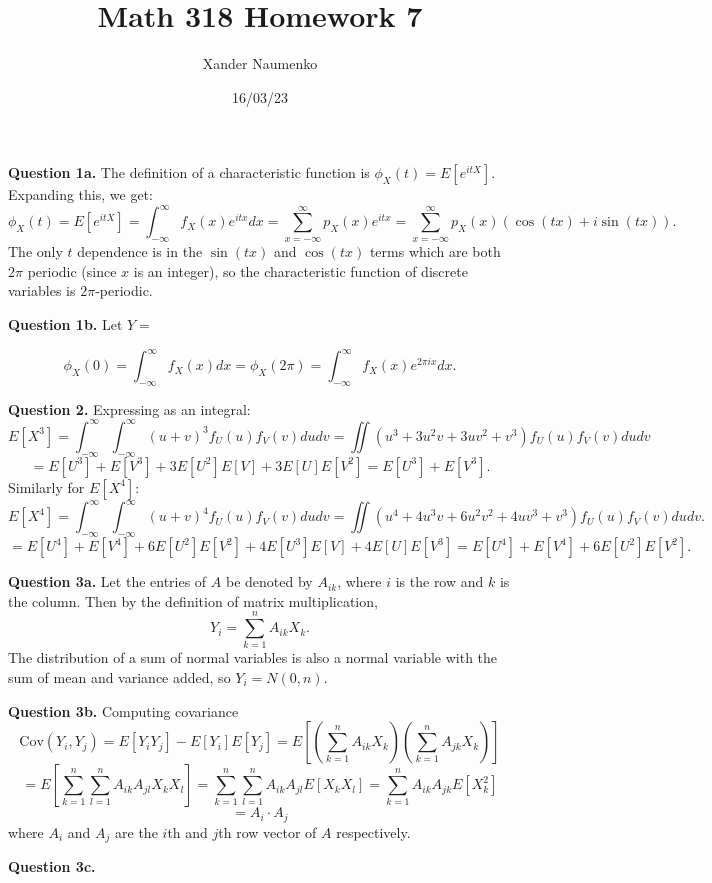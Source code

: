 \documentclass[letterpaper, reqno,11pt]{article}
\begin{document}
\title{Math 318 Homework 7}
\date{16/03/23}
\author{Xander Naumenko}
\maketitle

{\medskip\noindent\bf Question 1a.} The definition of a characteristic function is $\phi_{X}(t)=E[e^{itX}]$. Expanding this, we get: 
\[
\phi_{X}(t)=E[e^{itX}]=\int_{-\infty}^{\infty}f_X(x) e^{itx}dx=\sum_{x=-\infty}^{\infty}p_X(x) e^{itx}=\sum_{x=-\infty}^{\infty}p_X(x) \left( \cos(tx)+i\sin(tx) \right) 
.\]
The only $t$ dependence is in the $\sin(tx)$ and $\cos(tx)$ terms which are both $2\pi$ periodic (since $x$ is an integer), so the characteristic function of discrete variables is $2\pi$-periodic. 

{\medskip\noindent\bf Question 1b.} Let $Y=$

\[
\phi_X(0)=\int_{-\infty}^{\infty}f_X(x)dx=\phi_X(2\pi)=\int_{-\infty}^{\infty}f_X(x)e^{2\pi ix}dx
.\]

{\medskip\noindent\bf Question 2.} Expressing as an integral: 
\[
    E[X^3]=\int_{-\infty}^{\infty}\int_{-\infty}^{\infty}(u+v)^3f_U(u)f_V(v)dudv=\iint (u^3+3u^2v+3uv^2+v^3)f_U(u)f_V(v)dudv
\]
\[
    =E[U^3]+E[V^3]+3E[U^2]E[V]+3E[U]E[V^2]=E[U^3]+E[V^3]
.\]
Similarly for $E[X^{4}]$: 
\[
    E[X^4]=\int_{-\infty}^{\infty}\int_{-\infty}^{\infty}(u+v)^4f_U(u)f_V(v)dudv=\iint (u^4+4u^3v+6u^2v^2+4uv^3+v^3)f_U(u)f_V(v)dudv
.\]
\[
    =E[U^4]+E[V^4]+6E[U^2]E[V^2]+4E[U^3]E[V]+4E[U]E[V^3]=E[U^4]+E[V^4]+6E[U^2]E[V^2]
.\]

{\medskip\noindent\bf Question 3a.} Let the entries of $A$ be denoted by $A_{ik}$, where $i$ is the row and $k$ is the column. Then by the definition of matrix multiplication,
\[
    Y_i=\sum_{k=1}^{n}A_{ik}X_k
.\]
The distribution of a sum of normal variables is also a normal variable with the sum of mean and variance added, so $Y_i=N(0,n)$. 

{\medskip\noindent\bf Question 3b.} Computing covariance
\[
    \text{Cov}(Y_i,Y_j)=E[Y_iY_j]-E[Y_i]E[Y_j]=E\left[\left(\sum_{k=1}^{n}A_{ik}X_k\right)\left( \sum_{k=1}^{n}A_{jk}X_k \right) \right]
\]
\[
    =E\left[\sum_{k=1}^{n}\sum_{l=1}^{n}A_{ik}A_{jl}X_kX_l\right]=\sum_{k=1}^{n}\sum_{l=1}^{n}A_{ik}A_{jl}E[X_kX_l]=\sum_{k=1}^{n}A_{ik}A_{jk}E[X_k^2]
\]
\[
=A_i\cdot A_j
\]
where $A_i$ and $A_j$ are the $i$th and $j$th row vector of $A$ respectively.

{\medskip\noindent\bf Question 3c.} 
\end{document}

